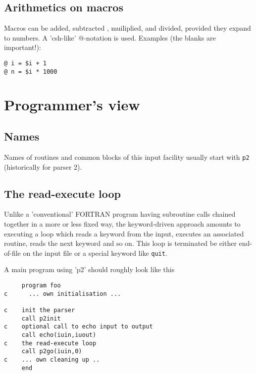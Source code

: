 \documentclass[a4paper]{article}
\begin{document}
\subsection{Arithmetics on macros}
Macros can be added, subtracted , muiliplied, and divided, provided they
expand to numbers. A 'csh-like' @-notation is used. Examples (the blanks are important!):
\begin{verbatim}
@ i = $i + 1
@ n = $i * 1000
\end{verbatim}

\section{Programmer's view}
\subsection{Names}
Names of routines and common blocks of this input facility usually 
start with {\tt p2} (historically for parser 2).
\subsection{The read-execute loop}
Unlike a 'conventional' FORTRAN program having subroutine calls chained 
together in a more or less fixed way, the keyword-driven approach amounts to
executing a loop which reads a keyword from the input, executes an associated
routine, reads the next keyword and so on. This loop is terminated be either
end-of-file on the input file or a special keyword like {\tt quit}.

A main program using 'p2' should roughly look like this
\begin{verbatim}
     program foo
c      ... own initialisation ...

c    init the parser
     call p2init
c    optional call to echo input to output
     call echo(iuin,iuout)
c    the read-execute loop
     call p2go(iuin,0)
c    ... own cleaning up ..
     end
\end{verbatim}
\end{document}
